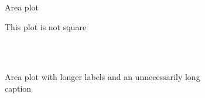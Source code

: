\documentclass{article}
\begin{document}
\begin{figure}[ht]
    \vspace{-15ex}
    \begin{subfigure}{0.425\textwidth}
        \def\svgwidth{1\columnwidth}
        
        \vspace{1ex}
        \caption{Area plot}
    \end{subfigure}
    \hspace{-0.425\textwidth}
    \begin{subfigure}{0.425\textwidth}
        \vspace{-0.89\columnwidth}
        \def\svgwidth{0.1\columnwidth}
        
    \end{subfigure}
    \hfill
    \begin{subfigure}{0.425\textwidth}
        \vspace{-0.85\columnwidth}
        \hspace{0.5\columnwidth}
        \def\svgwidth{0.1\columnwidth}
        
    \end{subfigure}
    \hspace{-0.425\textwidth}
    \begin{subfigure}{0.425\textwidth}
        \def\svgwidth{1\columnwidth}
        
        \vspace{1ex}
        \caption{This plot is not square}
    \end{subfigure}\\
    \vspace{4ex}\\
    \begin{subfigure}{0.425\textwidth}
        \def\svgwidth{1\columnwidth}
        
        \vspace{1ex}
        \caption{Area plot with longer labels and an unnecessarily long caption}
    \end{subfigure}
    \hspace{-0.425\textwidth}
    \begin{subfigure}{0.425\textwidth}
        \vspace{-0.95\columnwidth}
        \def\svgwidth{0.1\columnwidth}
        
    \end{subfigure}
    \hspace{-0.0425\textwidth}
    \hfill
    \begin{subfigure}{0.425\textwidth}

\end{subfigure}
\end{figure}
\end{document}
